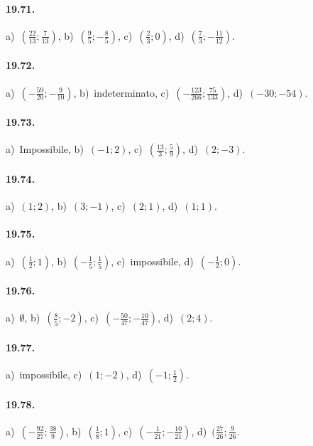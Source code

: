 \paragraph{19.71.} a)~$\left(\frac{22}{13};\frac{7}{13}\right)$, \quad b)~$\left(\frac{9}{5};-\frac{8}{5}\right)$,
\quad c)~$(\frac{2}{3};0)$, \quad d)~$\left(\frac{7}{3};-\frac{11}{12}\right)$.

\paragraph{19.72.} a)~$\left(-{\frac{59}{20}};-\frac{9}{10}\right)$, \quad b)~indeterminato, \quad c)~$(-{\frac{123}{266}};\frac{75}{133})$, \quad d)~$(-30;-54)$.

\paragraph{19.73.} a)~Impossibile, \quad b)~$(-1;2)$, \quad c)~$\left(\frac{13}{3};\frac{5}{9}\right)$, \quad d)~$(2;-3)$.

\paragraph{19.74.} a)~$(1;2)$, \quad b)~$(3;-1)$, \quad c)~$(2;1)$, \quad d)~$(1;1)$.

\paragraph{19.75.} a)~$\left(\frac{1}{2};1\right)$, \quad b)~$\left(-{\frac{1}{5}};\frac{1}{5}\right)$,
\quad c)~impossibile, \quad d)~$\left(-{\frac{1}{2}};0\right)$.

\paragraph{19.76.} a)~$\emptyset $, \quad b)~$\left(\frac{8}{5};-2\right)$, \quad c)~$(-\frac{50}{47};-\frac{10}{47})$,
\quad d)~$(2;4)$.

\paragraph{19.77.} a)~impossibile, \quad c)~$(1;-2)$, \quad d)~$(-1;\frac{1}{2})$.

\paragraph{19.78.} a)~$(-{\frac{92}{27}};\frac{38}{9})$, \quad b)~$(\frac{1}{8};1)$, \quad c)~$(-{\frac{1}{21}};-{\frac{10}{21}})$, \quad d)~$(\frac{27}{26};\frac{9}{26}$.

